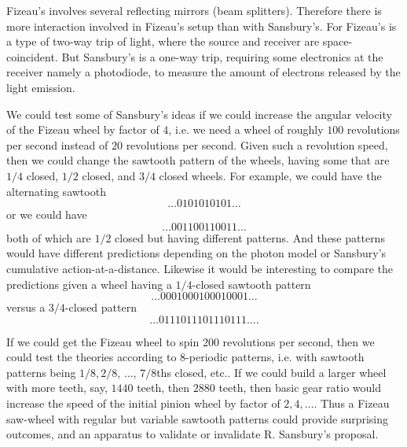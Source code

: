 \documentclass[12pt]{article}
\begin{document}
Fizeau's involves several reflecting mirrors (beam splitters). Therefore there is more interaction involved in Fizeau's setup than with Sansbury's. For Fizeau's is a type of two-way trip of light, where the source and receiver are space-coincident. But Sansbury's is a one-way trip, requiring some electronics at the receiver namely a photodiode, to measure the amount of electrons released by the light emission.

We could test some of Sansbury's ideas if we could increase the angular velocity of the Fizeau wheel by factor of $4$, i.e. we need a wheel of roughly $100$ revolutions per second instead of $20$ revolutions per second. Given such a revolution speed, then we could change the sawtooth pattern of the wheels, having some that are $1/4$ closed, $1/2$ closed, and $3/4$ closed wheels. For example, we could have the alternating sawtooth $$\ldots 0101010101 \ldots$$ or we could have $$\ldots 001100110011 \ldots$$ both of which are $1/2$ closed but having different patterns. And these patterns would have different predictions depending on the photon model or Sansbury's cumulative action-at-a-distance. Likewise it would be interesting to compare the predictions given a wheel having a $1/4$-closed sawtooth pattern $$\ldots 0001000100010001 \ldots$$ versus a $3/4$-closed pattern $$ \ldots 0111011101110111\ldots.$$ 

If we could get the Fizeau wheel to spin $200$ revolutions per second, then we could test the theories according to $8$-periodic patterns, i.e. with sawtooth patterns being $1/8, 2/8$, $\ldots$, $7/8$ths closed, etc.. If we could build a larger wheel with more teeth, say, $1440$ teeth, then $2880$ teeth, then basic gear ratio would increase the speed of the initial pinion wheel by factor of $2,4, \ldots$. Thus a Fizeau saw-wheel with regular but variable sawtooth patterns could provide surprising outcomes, and an apparatus to validate or invalidate R. Sansbury's proposal.






\end{document}
